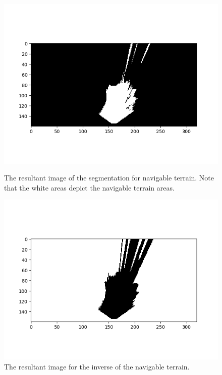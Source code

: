 \documentclass[a4paper]{article}
\begin{document}
\begin{figure}[h]
	\centering
	\begin{minipage}[t]{0.45\linewidth}
	\centering
	\includegraphics[scale=0.45]{image10}
	\vspace{-1.5cm}
	\caption{The resultant image of the segmentation for navigable terrain. Note that the white areas depict the navigable terrain areas.}
	\end{minipage}
	\hspace{0.5cm}
	\begin{minipage}[t]{0.45\linewidth}
	\centering
	\includegraphics[scale=0.45]{image11}
	\vspace{-1.5cm}
	\caption{The resultant image for the inverse of the navigable terrain.}
	\end{minipage}
\end{figure}
\end{document}

